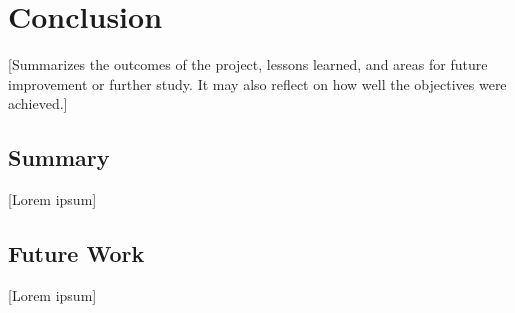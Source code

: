 \chapter{Conclusion}
\label{chap:conclusion}

[Summarizes the outcomes of the project, lessons learned, and areas for future improvement or further study. It may also reflect on how well the objectives were achieved.]

\section{Summary}
\label{sec:summary}
[Lorem ipsum]

\section{Future Work}
\label{sec:future_work}
[Lorem ipsum]

